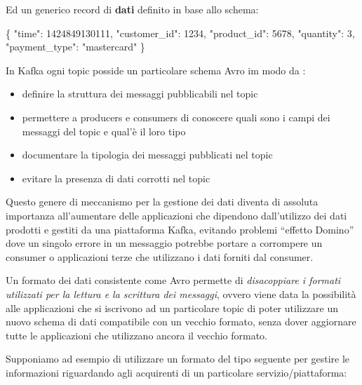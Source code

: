 \documentclass[]{article}
\newenvironment{Shaded}{}{}
\newcommand{\DataTypeTok}[1]{\textcolor[rgb]{0.56,0.13,0.00}{#1}}
\newcommand{\DecValTok}[1]{\textcolor[rgb]{0.25,0.63,0.44}{#1}}
\newcommand{\StringTok}[1]{\textcolor[rgb]{0.25,0.44,0.63}{#1}}
\newcommand{\FunctionTok}[1]{\textcolor[rgb]{0.02,0.16,0.49}{#1}}
\providecommand{\tightlist}{%
  \setlength{\itemsep}{0pt}\setlength{\parskip}{0pt}}
\begin{document}
\normalsize

\newpage

Ed un generico record di \textbf{dati} definito in base allo schema:

\small

\begin{Shaded}
\begin{Highlighting}[]
\FunctionTok{\{}
  \DataTypeTok{"time"}\FunctionTok{:} \DecValTok{1424849130111}\FunctionTok{,}
  \DataTypeTok{"customer_id"}\FunctionTok{:} \DecValTok{1234}\FunctionTok{,}
  \DataTypeTok{"product_id"}\FunctionTok{:} \DecValTok{5678}\FunctionTok{,}
  \DataTypeTok{"quantity"}\FunctionTok{:} \DecValTok{3}\FunctionTok{,}
  \DataTypeTok{"payment_type"}\FunctionTok{:} \StringTok{"mastercard"}
\FunctionTok{\}}
\end{Highlighting}
\end{Shaded}

\normalsize

In Kafka ogni topic posside un particolare schema Avro im modo da :

\begin{itemize}
\tightlist
\item
  definire la struttura dei messaggi pubblicabili nel topic
\item
  permettere a producers e consumers di conoscere quali sono i campi dei
  messaggi del topic e qual'è il loro tipo
\item
  documentare la tipologia dei messaggi pubblicati nel topic
\item
  evitare la presenza di dati corrotti nel topic
\end{itemize}

Questo genere di meccanismo per la gestione dei dati diventa di assoluta
importanza all'aumentare delle applicazioni che dipendono dall'utilizzo
dei dati prodotti e gestiti da una piattaforma Kafka, evitando problemi
``effetto Domino'' dove un singolo errore in un messaggio potrebbe
portare a corrompere un consumer o applicazioni terze che utilizzano i
dati forniti dal consumer.

Un formato dei dati consistente come Avro permette di \emph{disacoppiare
i formati utilizzati per la lettura e la scrittura dei messaggi}, ovvero
viene data la possibilità alle applicazioni che si iscrivono ad un
particolare topic di poter utilizzare un nuovo schema di dati
compatibile con un vecchio formato, senza dover aggiornare tutte le
applicazioni che utilizzano ancora il vecchio formato.

Supponiamo ad esempio di utilizzare un formato del tipo seguente per
gestire le informazioni riguardando agli acquirenti di un particolare
servizio/piattaforma:
\end{document}
